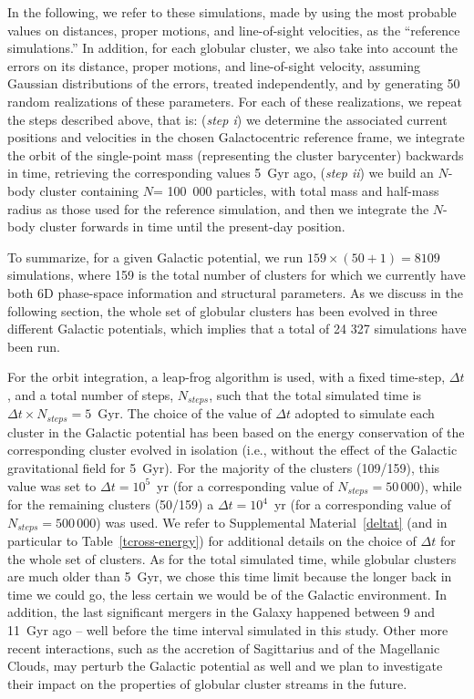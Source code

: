         In the following, we refer to these simulations, made by using the most probable values on distances, proper motions, and line-of-sight velocities, as the ``reference simulations.'' In addition, for each globular cluster, we also take into account the errors on its distance, proper motions, and line-of-sight velocity,  assuming Gaussian distributions of the errors, treated independently, and by generating 50 random realizations of these parameters.  For each of these realizations, we repeat the steps  described above, that is: (\textit{step i}) we determine the associated current positions and velocities in the chosen Galactocentric reference frame, we integrate the orbit of the single-point mass (representing the cluster barycenter) backwards in time, retrieving the corresponding values 5~Gyr ago, (\textit{step ii}) we build an $N$-body cluster containing $N$= 100~000 particles, with total mass and half-mass radius as those used for the reference simulation, and then we integrate the $N$-body cluster forwards in time until the present-day position. 

        To summarize, for a given Galactic potential, we run $159\times (50+1)=8109$ simulations, where 159 is the total number of clusters for which we currently have both 6D phase-space information and structural parameters. As we discuss in the following section, the whole set of globular clusters has been evolved in three different Galactic potentials, which implies that a total of 24 327 simulations have been run.

        For the orbit integration, a leap-frog algorithm is used, with a fixed time-step, $\Delta t$, and a total number of steps, $N_{steps}$, such that the total simulated time is  $\Delta t \times N_{steps}=5$~Gyr. The choice of the value of $\Delta t$ adopted to simulate each cluster in the Galactic potential has been based on the energy conservation of the corresponding cluster evolved in isolation (i.e., without the effect of the Galactic gravitational field for 5~Gyr). For the majority of the clusters (109/159), this value was set to $\Delta t = 10^5$~yr (for a corresponding value of $N_{steps}=50\,000$), while for the remaining clusters (50/159) a  $\Delta t = 10^4$~yr (for a corresponding value of $N_{steps}=500\,000$) was used. We refer to Supplemental Material~\ref{deltat} (and in particular to Table~\ref{tcross-energy}) for additional details on the choice of $\Delta t$ for the whole set of clusters. As for the total simulated time, while globular clusters are much older than 5~Gyr, we chose this time limit because the longer back in time we could go, the less certain we would be of the Galactic environment. In addition, the last significant mergers in the Galaxy happened between 9 and 11~Gyr ago  \citep[see][]{2018MNRAS.478..611B, 2018Natur.563...85H, 2019A&A...632A...4D, 2019NatAs...3..932G, 2020MNRAS.498.2472K} -- well before the time interval simulated in this study. Other more recent interactions, such as the accretion of Sagittarius and of the Magellanic Clouds, may perturb the Galactic potential as well \citep[see, e.g.,][]{2021MNRAS.501.2279V} and we plan to investigate their impact on the properties of globular cluster streams in the future.

